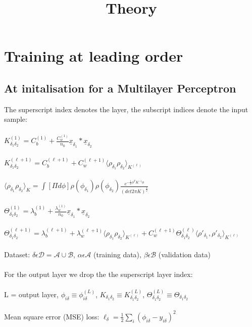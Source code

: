 \documentclass{article}
\title{Theory}
\author{}
\begin{document}
\section{Training at leading order}
\subsection{At initalisation for a Multilayer Perceptron}
The superscript index denotes the layer, the subscript indices denote the input sample:\\ \\
$K^{(1)}_{\delta_1\delta_2} = C^{(1)}_b + \frac{C^{(1)}_w }{n_0} \underline{x}_{\delta_1} * \underline{x}_{\delta_2}$
\\
\\
$K^{(\ell +1)}_{\delta_1\delta_2} = C^{(\ell +1)}_b + C^{(\ell +1)}_w \langle \rho_{\delta_1} \rho_{\delta_2} \rangle _{K^{(\ell)}}$
\\
\\
$\langle \rho_{\delta_1} \rho_{\delta_2} \rangle _K = \int[\Pi d\phi]   \rho(\phi_{\delta_1}) \rho(\phi_{\delta_2}) \frac{e^{ -\frac{1}{2}\phi^{T}K^{-1}\phi}}{(det 2 \pi K)^{\frac{1}{2}} } $
\\
\\
$\Theta^{(1)}_{\delta_1\delta_2} = \lambda^{(1)}_b + \frac{\lambda^{(1)}_w }{n_0} \underline{x}_{\delta_1} * \underline{x}_{\delta_2}$
\\
\\
$\Theta^{(\ell +1)}_{\delta_1\delta_2} = \lambda^{(\ell +1)}_b + \lambda^{(\ell +1)}_w  \langle \rho_{\delta_1} \rho_{\delta_2} \rangle _{K^{(\ell)}} + C^{(\ell +1)}_w  \Theta^{(\ell)}_{\delta_1\delta_2} \langle \rho'_{\delta_1}, \rho'_{\delta_2} \rangle _{K^{(\ell)}}$
\\
\\
Dataset: $\delta \epsilon \mathcal{D} = \mathcal{A} \cup \mathcal{B}$, $\alpha \epsilon \mathcal{A}$ (training data), $\beta \epsilon \mathcal{B}$ (validation data)
\\
\\
For the output layer we drop the the superscript layer index:\\ \\
L = output layer, $\phi_{i\delta} \equiv \phi^{(L)}_{i\delta} $, $K_{\delta_1\delta_2} \equiv K^{(L)}_{\delta_1\delta_2} $, $\Theta^{(L)}_{\delta_1\delta_2} \equiv \Theta_{\delta_1\delta_2}$
\\
\\
Mean square error (MSE) loss: $\ell_\delta=\frac{1}{2} \sum_{i}(\phi_{i\delta}-y_{i\delta})^2$
\end{document}
